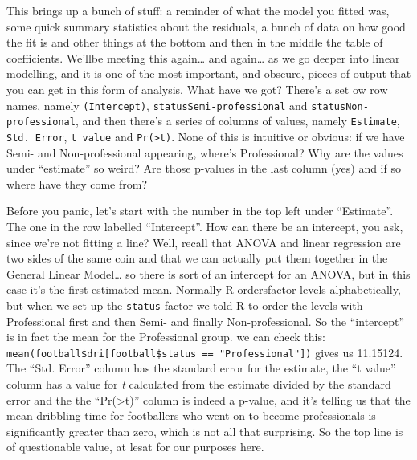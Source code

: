 \documentclass[
]{book}
\begin{document}
This brings up a bunch of stuff: a reminder of what the model you fitted was, some quick summary statistics about the residuals, a bunch of data on how good the fit is and other things at the bottom and then in the middle the table of coefficients. We'llbe meeting this again\ldots{} and again\ldots{} as we go deeper into linear modelling, and it is one of the most important, and obscure, pieces of output that you can get in this form of analysis. What have we got? There's a set ow row names, namely \texttt{(Intercept)}, \texttt{statusSemi-professional} and \texttt{statusNon-professional}, and then there's a series of columns of values, namely \texttt{Estimate}, \texttt{Std.\ Error}, \texttt{t\ value} and \texttt{Pr(\textgreater{}\textbar{}t\textbar{})}. None of this is intuitive or obvious: if we have Semi- and Non-professional appearing, where's Professional? Why are the values under ``estimate'' so weird? Are those p-values in the last column (yes) and if so where have they come from?

Before you panic, let's start with the number in the top left under ``Estimate''. The one in the row labelled ``Intercept''. How can there be an intercept, you ask, since we're not fitting a line? Well, recall that ANOVA and linear regression are two sides of the same coin and that we can actually put them together in the General Linear Model\ldots{} so there is sort of an intercept for an ANOVA, but in this case it's the first estimated mean. Normally R ordersfactor levels alphabetically, but when we set up the \texttt{status} factor we told R to order the levels with Professional first and then Semi- and finally Non-professional. So the ``intercept'' is in fact the mean for the Professional group. we can check this: \texttt{mean(football\$dri{[}football\$status\ ==\ "Professional"{]})} gives us 11.15124. The ``Std. Error'' column has the standard error for the estimate, the ``t value'' column has a value for \emph{t} calculated from the estimate divided by the standard error and the the ``Pr(\textgreater\textbar t\textbar)'' column is indeed a p-value, and it's telling us that the mean dribbling time for footballers who went on to become professionals is significantly greater than zero, which is not all that surprising. So the top line is of questionable value, at lesat for our purposes here.
\end{document}
